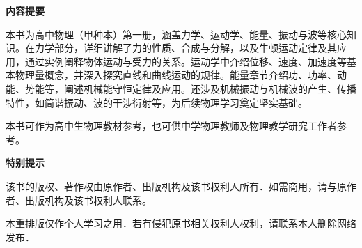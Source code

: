 

    \label{abstract}
    \begin{center}
    	\bfseries{内\quad 容\quad 提\quad 要}
    \end{center}
    \hspace{2em}本书为高中物理（甲种本）第一册，涵盖力学、运动学、能量、振动与波等核心知识。在力学部分，详细讲解了力的性质、合成与分解，以及牛顿运动定律及其应用，通过实例阐释物体运动与受力的关系。运动学中介绍位移、速度、加速度等基本物理量概念，并深入探究直线和曲线运动的规律。能量章节介绍功、功率、动能、势能等，阐述机械能守恒定律及应用。还涉及机械振动与机械波的产生、传播特性，如简谐振动、波的干涉衍射等，为后续物理学习奠定坚实基础。\par
    
	本书可作为高中生物理教材参考，也可供中学物理教师及物理教学研究工作者参考。

	\vspace{4.0cm}
	
	\label{tips}
	\begin{center}
		\bfseries{特\quad 别\quad 提\quad 示}
	\end{center}
	\hspace{2em}该书的版权、著作权由原作者、出版机构及该书权利人所有．如需商用，请与原作者、出版机构及该书权利人联系。\par
		
	本重排版仅作个人学习之用．若有侵犯原书相关权利人权利，请联系本人删除网络发布．
		
\thispagestyle{empty}